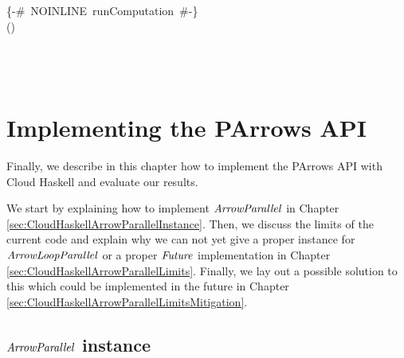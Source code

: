 \documentclass[paper=A4,twoside=true,openright,parskip=full,chapterprefix=true,headings=normal,bibliography=totoc,listof=totoc,titlepage=on,captions=tableabove,draft=false,british]{scrreprt}%
\begin{document}
\begin{hscode}\SaveRestoreHook
{}%
%
%
\>[B]{}\mbox{\enskip\{-\# NOINLINE runComputation  \#-\}\enskip}{}\<[E]%
\\
\>[B]{}\mathbin{::}\;(\;)\to {}\<[E]%
\\
\>[B]{}\;\mathrel{=}\mathbin{\$}\<[E]%
\\
\>[B]{}\<[3]%
\>[3]{}\leftarrow {}\<[E]%
\\
\>[B]{}\<[3]%
\>[3]{}\;\<[E]%
\\
\>[B]{}\<[3]%
\>[3]{}\;\<[E]%
\ColumnHook
\end{hscode}\resethooks
\vspace{-2\baselineskip}

\hypertarget{implementing-the-parrows-api}{%
\section{Implementing the PArrows
API}\label{implementing-the-parrows-api}}

\label{sec:CloudHaskellArrowParallel}

Finally, we describe in this chapter how to implement the PArrows API
with Cloud Haskell and evaluate our results.

We start by explaining how to implement \ensuremath{\Conid{ArrowParallel}} in Chapter
\ref{sec:CloudHaskellArrowParallelInstance}. Then, we discuss the limits
of the current code and explain why we can not yet give a proper
instance for \ensuremath{\Conid{ArrowLoopParallel}} or a proper \ensuremath{\Conid{Future}} implementation in
Chapter \ref{sec:CloudHaskellArrowParallelLimits}. Finally, we lay out a
possible solution to this which could be implemented in the future in
Chapter \ref{sec:CloudHaskellArrowParallelLimitsMitigation}.

\hypertarget{arrowparallel-instance}{%
\subsection{\texorpdfstring{\ensuremath{\Conid{ArrowParallel}}
instance}{ instance}}\label{arrowparallel-instance}}

\label{sec:CloudHaskellArrowParallelInstance}
\end{document}

